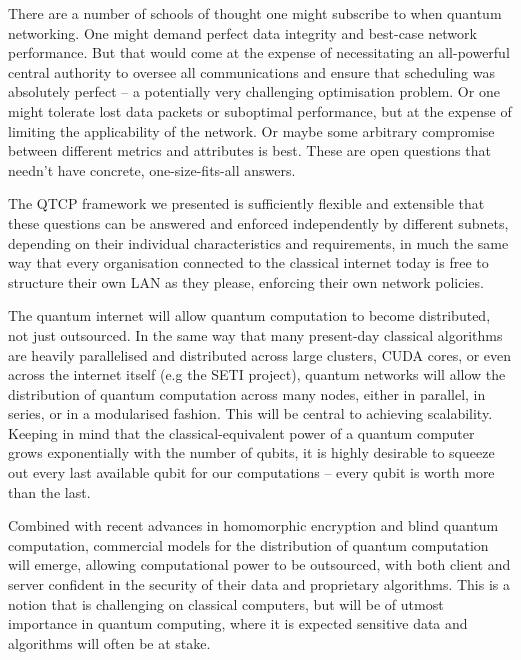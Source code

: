 \documentclass[aps,rmp,twocolumn,amsmath,amssymb,nofootinbib,superscriptaddress,longbibliography,floatfix]{revtex4-1}
\begin{document}
There are a number of schools of thought one might subscribe to when quantum networking. One might demand perfect data integrity and best-case network performance. But that would come at the expense of necessitating an all-powerful central authority to oversee all communications and ensure that scheduling was absolutely perfect -- a potentially very challenging optimisation problem. Or one might tolerate lost data packets or suboptimal performance, but at the expense of limiting the applicability of the network. Or maybe some arbitrary compromise between different metrics and attributes is best. These are open questions that needn't have concrete, one-size-fits-all answers.

The QTCP framework we presented is sufficiently flexible and extensible that these questions can be answered and enforced independently by different subnets, depending on their individual characteristics and requirements, in much the same way that every organisation connected to the classical internet today is free to structure their own LAN as they please, enforcing their own network policies.

The quantum internet will allow quantum computation to become distributed, not just outsourced. In the same way that many present-day classical algorithms are heavily parallelised and distributed across large clusters, CUDA cores, or even across the internet itself (e.g the SETI project), quantum networks will allow the distribution of quantum computation across many nodes, either in parallel, in series, or in a modularised fashion. This will be central to achieving scalability. Keeping in mind that the classical-equivalent power of a quantum computer grows exponentially with the number of qubits, it is highly desirable to squeeze out every last available qubit for our computations -- every qubit is worth more than the last.

Combined with recent advances in homomorphic encryption and blind quantum computation, commercial models for the distribution of quantum computation will emerge, allowing computational power to be outsourced, with both client and server confident in the security of their data and proprietary algorithms. This is a notion that is challenging on classical computers, but will be of utmost importance in quantum computing, where it is expected sensitive data and algorithms will often be at stake.
\end{document}
